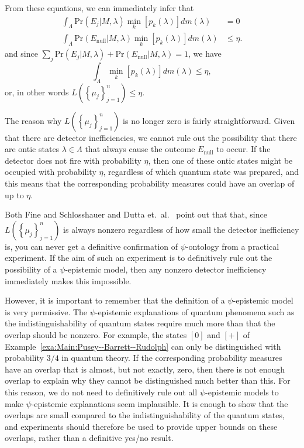 \documentclass[DIV=calc,fontsize=12pt]{scrartcl} %
\theoremstyle{definition}
\theoremstyle{plain}
\newcommand{\Proj}[1]{\ensuremath{\left [ #1 \right ]}}
\begin{document}
From these equations, we can immediately infer that
\begin{align}
\int_{\Lambda} \text{Pr}(E_j|M,\lambda) \min_k \left [ p_k(\lambda)
\right ] dm(\lambda) & = 0 \\
\int_{\Lambda} \text{Pr}(E_{\text{null}}|M,\lambda) \min_k \left [
p_k(\lambda) \right ] dm(\lambda) & \leq \eta.
\end{align}
and since $\sum_j \text{Pr}(E_j|M,\lambda) +
\text{Pr}(E_{\text{null}}|M,\lambda) = 1$, we have
\begin{equation}
\int_{\Lambda} \min_k \left [ p_k(\lambda) \right ] dm(\lambda) \leq
\eta,
\end{equation}
or, in other words $L \left ( \left \{ \mu_j \right \}_{j=1}^n \right
) \leq \eta$.

The reason why $L \left ( \left \{ \mu_j \right \}_{j=1}^n \right )$
is no longer zero is fairly straightforward.  Given that there are
detector inefficiencies, we cannot rule out the possibility that there
are ontic states $\lambda \in \Lambda$ that always cause the outcome
$E_{\text{null}}$ to occur.  If the detector does not fire with
probability $\eta$, then one of these ontic states might be occupied
with probability $\eta$, regardless of which quantum state was
prepared, and this means that the corresponding probability measures
could have an overlap of up to $\eta$.

Both Fine and Schlosshauer \cite{Schlosshauer2012} and Dutta et.\ al.\
\cite{Dutta2014} point out that that, since $L \left ( \left \{ \mu_j
\right \}_{j=1}^n \right )$ is always nonzero regardless of how
small the detector inefficiency is, you can never get a definitive
confirmation of $\psi$-ontology from a practical experiment.  If the
aim of such an experiment is to definitively rule out the possibility
of a $\psi$-epistemic model, then any nonzero detector inefficiency
immediately makes this impossible.

However, it is important to remember that the definition of a
$\psi$-epistemic model is very permissive.  The $\psi$-epistemic
explanations of quantum phenomena such as the indistinguishability of
quantum states require much more than that the overlap should be
nonzero.  For example, the states $\Proj{0}$ and $\Proj{+}$ of
Example~\ref{exa:Main:Pusey--Barrett--Rudolph} can only be distinguished with probability
$3/4$ in quantum theory.  If the corresponding probability measures
have an overlap that is almost, but not exactly, zero, then there is
not enough overlap to explain why they cannot be distinguished much
better than this.  For this reason, we do not need to definitively
rule out all $\psi$-epistemic models to make $\psi$-epistemic
explanations seem implausible.  It is enough to show that the overlaps
are small compared to the indistinguishability of the quantum states,
and experiments should therefore be used to provide upper bounds on
these overlaps, rather than a definitive yes/no result.
\end{document}

